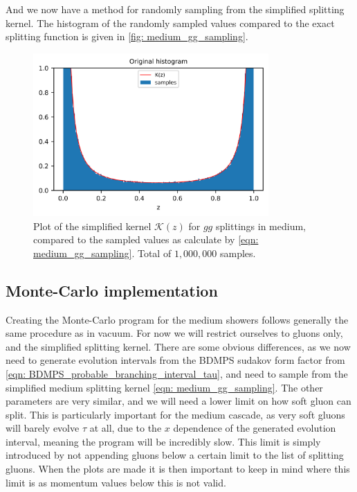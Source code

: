 \documentclass[main.tex]{subfiles}
\begin{document}
And we now have a method for randomly sampling from the simplified splitting kernel. The histogram of the randomly sampled values compared to the exact splitting function is given in \autoref{fig: medium_gg_sampling}. 
\begin{figure}[htb]
    \centering
    \includegraphics[width=9cm]{pictures/plots/splitting_functions/medium_gg_samples.png}
    \caption{Plot of the simplified kernel \(\mathcal{K}(z)\) for \(gg\) splittings in medium, compared to the sampled values as calculate by \autoref{eqn: medium_gg_sampling}. Total of  \(1,000,000\) samples.}
    \label{fig: medium_gg_sampling}
\end{figure}

\subsection{Monte-Carlo implementation}
Creating the Monte-Carlo program for the medium showers follows generally the same procedure as in vacuum. For now we will restrict ourselves to gluons only, and the simplified splitting kernel. There are some obvious differences, as we now need to generate evolution intervals from the BDMPS sudakov form factor from \autoref{eqn: BDMPS_probable_branching_interval_tau}, and need to sample from the simplified medium splitting kernel \autoref{eqn: medium_gg_sampling}. The other parameters are very similar, and we will need a lower limit on how soft gluon can split. This is particularly important for the medium cascade, as very soft gluons will barely evolve \(\tau\) at all, due to the \(x\) dependence of the generated evolution interval, meaning the program will be incredibly slow. This limit is simply introduced by not appending gluons below a certain limit to the list of splitting gluons. When the plots are made it is then important to keep in mind where this limit is as momentum values below this is not valid. 
\end{document}
